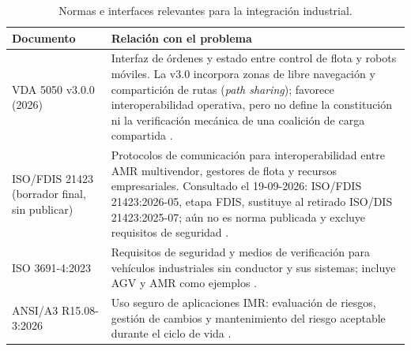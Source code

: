\begin{table}[!htbp]
  \centering
  \caption{Normas e interfaces relevantes para la integración industrial.}
  \label{tab:tf-standards}
{\fontsize{6.95}{7.65}\selectfont\setlength{\tabcolsep}{2.2pt}\renewcommand{\arraystretch}{1.16}
\begin{tabularx}{\linewidth}{@{}J{3.15cm}Z@{}}
\toprule
\textbf{Documento} & \textbf{Relación con el problema}\\
\midrule
{} VDA 5050 v3.0.0 (2026) & Interfaz de órdenes y estado entre control de flota y robots móviles. La v3.0 incorpora zonas de libre navegación y compartición de rutas (\textit{path sharing}); favorece interoperabilidad operativa, pero no define la constitución ni la verificación mecánica de una coalición de carga compartida \parencite{vda5050v3}.\\
ISO/FDIS 21423 (borrador final, sin publicar) & Protocolos de comunicación para interoperabilidad entre AMR multivendor, gestores de flota y recursos empresariales. Consultado el 19-09-2026: ISO/FDIS 21423:2026-05, etapa FDIS, sustituye al retirado ISO/DIS 21423:2025-07; aún no es norma publicada y excluye requisitos de seguridad \parencite{iso21423}.\\
 ISO 3691-4:2023 & Requisitos de seguridad y medios de verificación para vehículos industriales sin conductor y sus sistemas; incluye AGV y AMR como ejemplos \parencite{iso36914}.\\
ANSI/A3 R15.08-3:2026 & Uso seguro de aplicaciones IMR: evaluación de riesgos, gestión de cambios y mantenimiento del riesgo aceptable durante el ciclo de vida \parencite{ansiA3R1508part3}.\\
\bottomrule
\end{tabularx}}
\end{table}
